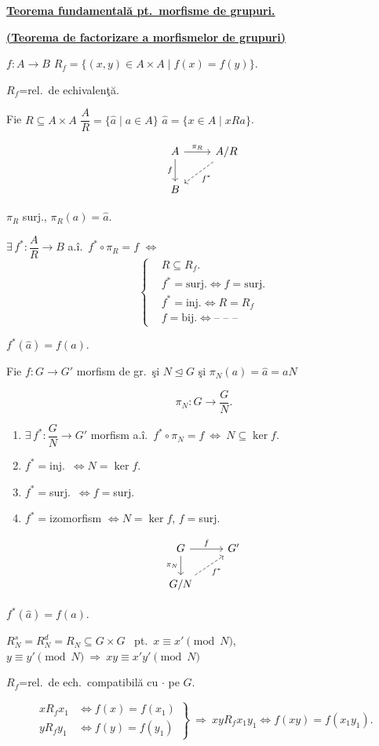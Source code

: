 \documentclass[12pt]{article}
\begin{document}
\noindent\underline{\textbf{Teorema fundamentală pt.\ morfisme de grupuri.}}

\noindent\underline{\textbf{(Teorema de factorizare a morfismelor de grupuri)}}

\bigskip
\noindent $f:A\to B$ \qquad $R_f = \{(x,y)\in A\times A \mid f(x)=f(y)\}$.

\noindent $R_f$=rel.\ de echivalenţă.

\bigskip
\noindent Fie $R\subseteq A\times A$ \qquad $\dfrac{A}{R} = \{\hat a \mid a\in A\}$ \qquad $\hat a = \{x\in A \mid xRa\}$.

\[
\begin{tikzcd}
A \arrow[r,"\pi_R"] \arrow[d,"f"'] & A/R \arrow[dl, dashed,"f^*"] \\
B &
\end{tikzcd}
\]

\noindent $\pi_R$ surj., \quad $\pi_R(a) = \hat a$.

\bigskip
\noindent $\exists\,f^*: \dfrac{A}{R} \to B$ a.î.\ $f^*\circ\pi_R = f$ $\Leftrightarrow$
\[
\left\{\begin{aligned}
&R\subseteq R_f.\\
&f^*=\text{surj.} \Leftrightarrow f=\text{surj.}\\
&f^*=\text{inj.} \Leftrightarrow R=R_f\\
&f=\text{bij.} \Leftrightarrow \text{-- -- --}
\end{aligned}\right.
\]

\noindent $f^*(\hat a) = f(a)$.

\bigskip
\noindent Fie $f:G\to G'$ morfism de gr.\ şi $N\trianglelefteq G$ şi $\pi_N(a) = \hat a = aN$

\[
\pi_N: G \to \dfrac{G}{N}.
\]

\begin{enumerate}
\item[(1)] $\exists\,f^*: \dfrac{G}{N}\to G'$ morfism a.î.\ $f^*\circ\pi_N = f \ \Leftrightarrow \ N\subseteq\ker f$.
\item[(2)] $f^*=$inj.\ $\Leftrightarrow N=\ker f$.
\item[(3)] $f^*=$surj.\ $\Leftrightarrow f=$surj.
\item[(4)] $f^*=$izomorfism $\Leftrightarrow N=\ker f$, $f=$surj.
\end{enumerate}

\[
\begin{tikzcd}
G \arrow[r,"f"] \arrow[d,"\pi_N"'] & G' \\
G/N \arrow[ur, dashed,"f^*"'] &
\end{tikzcd}
\]

\noindent $f^*(\hat a) = f(a)$.

\bigskip
\noindent $R_N^s = R_N^d = R_N \subseteq G\times G$ \ pt.\ $x\equiv x' \pmod N$, $y\equiv y' \pmod N \ \Rightarrow \ xy\equiv x'y' \pmod N$

\bigskip
\noindent $R_f$=rel.\ de ech.\ compatibilă cu $\cdot$ pe $G$.

\[
\left.\begin{aligned}
xR_fx_1 &\Leftrightarrow f(x)=f(x_1)\\
yR_fy_1 &\Leftrightarrow f(y)=f(y_1)
\end{aligned}\right\} \ \Rightarrow \ xyR_fx_1y_1 \Leftrightarrow f(xy)=f(x_1y_1).
\]
\end{document}
